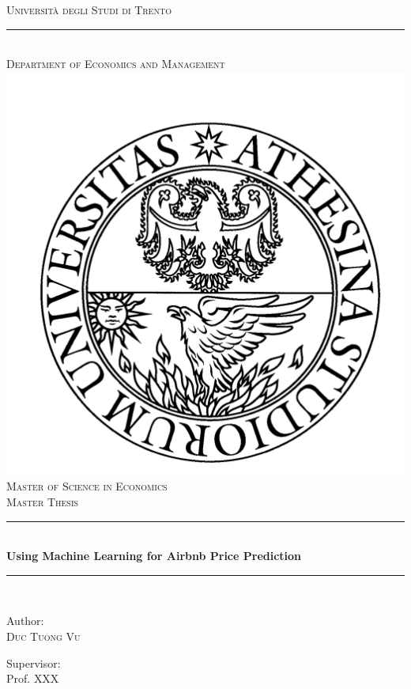 \documentclass[a4paper,12pt,twoside]{report}
\begin{document}
\begin{onehalfspace}

	\fancyhf{} %
	\rhead{\thepage}
	\lhead{\nouppercase{\leftmark}} %

\begin{titlepage}
\begin{center}

\textsc{\huge Università degli Studi di Trento}\\[-0.375cm] %
\rule{0.85\linewidth}{0.125mm}\\[0.25cm]
\textsc{\Large Department of Economics and Management}\\[1.25cm] %
\includegraphics[width=0.3\linewidth]{logo_unitn.png}\\[1.25cm] %
\textsc{\LARGE Master of Science in Economics}\\[2cm] %
\textsc{\LARGE Master Thesis}\\[0.5cm] %

\rule{\linewidth}{0.5mm}\\[0.75cm] %
{\Large \textbf{Using Machine Learning for Airbnb Price Prediction}}\\[0.5cm] %
\rule{\linewidth}{0.5mm}\\[1cm] %

\begin{minipage}{0.4\textwidth}
\begin{flushleft} \large
Author:\\
\textsc{Duc Tuong Vu} %
\end{flushleft}
\end{minipage}
\begin{minipage}{0.4\textwidth}
\begin{flushright} \large
Supervisor:\\
Prof. \textsc{XXX} %
\end{flushright}
\end{minipage}\\[3cm]


\end{center}
\end{titlepage}
\end{onehalfspace}
\end{document}
